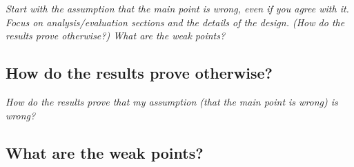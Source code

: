 \documentclass[11pt]{article}
\begin{document}
\emph{Start with the assumption that the main point is wrong, even if
  you agree with it. Focus on analysis/evaluation sections and the
  details of the design. (How do the results prove otherwise?) What
  are the weak points?}

\subsection{How do the results prove otherwise?}
\emph{How do the results prove that my assumption (that the main point
  is wrong) is wrong?}

\subsection{What are the weak points?}
\end{document}
